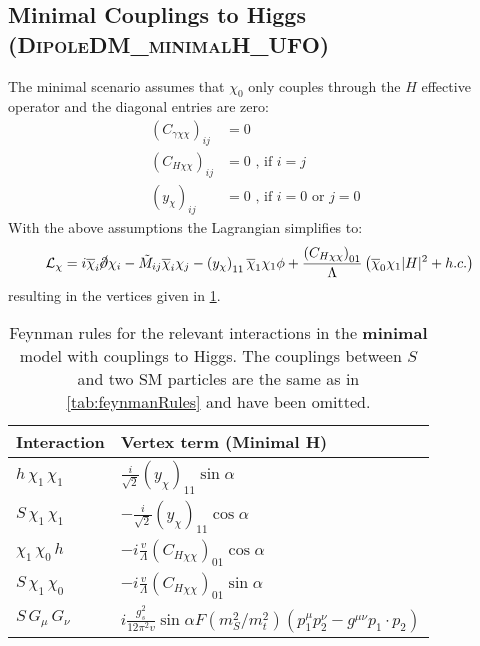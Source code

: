 \documentclass[a4paper,11pt]{article}
\begin{document}
\newpage
\clearpage
\subsection{Minimal Couplings to Higgs (\textsc{\small DipoleDM\_minimalH\_UFO})}

The minimal scenario assumes that $\chi_0$ only couples through the $H$ effective operator and the diagonal entries are zero:
\begin{align}
	(C_{\gamma\chi\chi})_{ij} &= 0\\
	(C_{H\chi\chi})_{ij} &= 0 \mbox{ , if $i = j$} \\
	(y_{\chi})_{ij} & = 0 \mbox{ , if $i = 0$ or $j = 0$ }
\end{align}
With the above assumptions the Lagrangian simplifies to:
\begin{equation}
	\mathcal{L}_{\chi} =  i \overline{\chi}_i \cancel \partial \chi_i - \tilde{M}_{ij} \overline{\chi}_i \chi_j - \left(y_\chi\right)_{11} \overline{\chi}_1 \chi_1 \phi + \frac{\left(C_{H \chi \chi}\right)_{01}}{\Lambda} \left( \overline{\chi}_0 \chi_1 |H|^2 + h.c.\right)
\end{equation}
resulting in the vertices given in \cref{tab:feynmanRulesH}.

\begin{table}[h!]   \centering
	\vspace{0.2cm}
	\begin{tabular}{p{2cm}|p{8.5cm}}
		\toprule
		\textbf{Interaction} & \textbf{Vertex term (Minimal H)}\\ \toprule 
		$h\, \chi_1\,\chi_1$ & $\frac{i}{\sqrt{2}} (y_{\chi})_{11} \sin\alpha$\\
		$S\,\chi_1\,\chi_1$  & $-\frac{i}{\sqrt{2}} (y_{\chi})_{11} \cos\alpha $\\
		$\chi_1\,\chi_0\,h$  & $-i \frac{v}{\Lambda} (C_{H\chi\chi})_{01} \cos\alpha$\\
		$S\,\chi_1\,\chi_0$ &  $-i \frac{v}{\Lambda} (C_{H\chi\chi})_{01} \sin\alpha$\\
    	$S\,G_\mu\,G_\nu$  & $i \frac{g_s^2}{12 \pi^2 v} \sin\alpha F(m^2_S/m^2_t) (p_1^\mu p_2^\nu - g^{\mu\nu} p_1\cdot p_2) $\\
		\bottomrule        
	\end{tabular}
	\caption{Feynman rules for the relevant interactions in the {\bf minimal} model with couplings to Higgs. The couplings between $S$ and two SM particles are the same as in \cref{tab:feynmanRules} and have been omitted. \label{tab:feynmanRulesH}}
\end{table}
\end{document}
